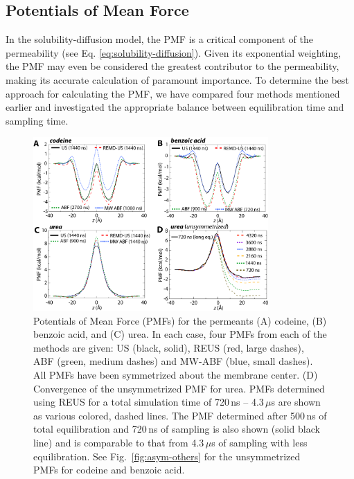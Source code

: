 \subsection{Potentials of Mean Force}
\par In the solubility-diffusion model, the PMF is a critical component of the permeability (see Eq. \ref{eq:solubility-diffusion}). Given its exponential weighting, the PMF may even be considered the greatest contributor to the permeability, making its accurate calculation of paramount importance.  To determine the best approach for calculating the PMF, we have compared four methods mentioned earlier and investigated the appropriate balance between equilibration time and sampling time.

\begin{figure}[!htbp]
\begin{center}
\includegraphics[width=0.8\textwidth]{Figures/PMFs-all}
\caption[Potentials of Mean Force for the permeants codeine, benzoic acid, and urea]{Potentials of Mean Force (PMFs) for the permeants (A) codeine, (B) benzoic acid, and (C) urea.  In each case, four PMFs from each of the methods are given: US (black, solid), REUS (red, large dashes), ABF (green, medium dashes) and MW-ABF (blue, small dashes).  All PMFs have been symmetrized about the membrane center.  (D) Convergence of the unsymmetrized PMF for urea.  PMFs determined using REUS for a total simulation time of 720\,ns -- 4.3\,$\mu$s are shown as various colored, dashed lines.  The PMF determined after 500\,ns of total equilibration and 720\,ns of sampling is also shown (solid black line) and is comparable to that from 4.3\,$\mu$s of sampling with less equilibration. See Fig.~\ref{fig:asym-others} for the unsymmetrized PMFs for codeine and benzoic acid.}
\label{fig:PMFs}
\end{center}
\end{figure}


